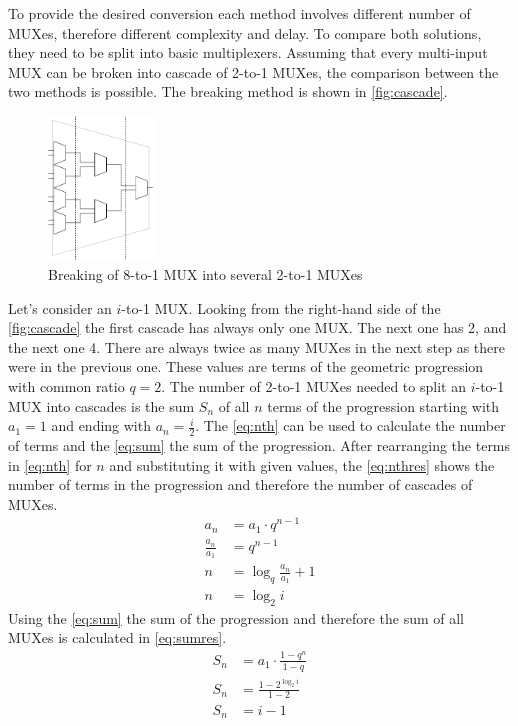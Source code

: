 To provide the desired conversion each method involves different number of MUXes, therefore different complexity and delay. To compare both solutions, they need to be split into basic multiplexers. Assuming that every multi-input MUX can be broken into cascade of 2-to-1 MUXes, the comparison between the two methods is possible. The breaking method is shown in \autoref{fig:cascade}.

\begin{figure}[h]
\centering
\includegraphics[width=0.25\textwidth]{figures/cascade.png}
\caption{Breaking of 8-to-1 MUX into several 2-to-1 MUXes}
\label{fig:cascade}
\end{figure}

Let's consider an $i$-to-1 MUX. Looking from the right-hand side of the \autoref{fig:cascade} the first cascade has always only one MUX. The next one has 2, and the next one 4. There are always twice as many MUXes in the next step as there were in the previous one. These values are terms of the geometric progression with common ratio $q=2$. The number of 2-to-1 MUXes needed to split an $i$-to-1 MUX into cascades is the sum $S_n$ of all $n$ terms of the progression starting with $a_1=1$ and ending with $a_n=\frac{i}{2}$. The \autoref*{eq:nth} can be used to calculate the number of terms and the \autoref*{eq:sum} the sum of the progression. After rearranging the terms in \autoref*{eq:nth} for $n$ and substituting it with given values, the \autoref*{eq:nthres} shows the number of terms in the progression and therefore the number of cascades of MUXes.
\begin{subequations}
\begin{align}
    a_n&=a_1\cdot q^{n-1}\label{eq:nth}\\
    \frac{a_n}{a_1} &=  q^{n-1}\\
    n &= \log_q \frac{a_n}{a_1}+1\\
    n &= \log_2 i\label{eq:nthres}
\end{align}
\end{subequations}
Using the \autoref*{eq:sum} the sum of the progression and therefore the sum of all MUXes is calculated in \autoref*{eq:sumres}.
\begin{subequations}
\begin{align}
    S_n&=a_1\cdot\frac{1-q^{n}}{1-q}\label{eq:sum}\\
    S_n&=\frac{1-2^{\log_2 i}}{1-2}\\
    S_n&=i-1\label{eq:sumres}
\end{align}
\end{subequations}


